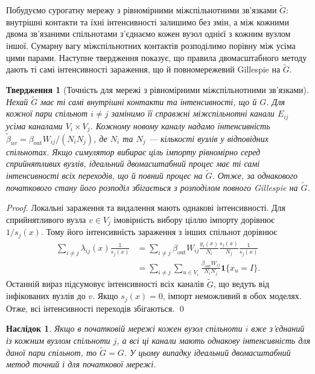 \documentclass[a4paper,fleqn]{cas-sc}
\newtheorem{proposition}{Твердження}
\newtheorem{corollary}{Наслідок}
\newcommand{\ind}{\mathbf{1}}
\begin{document}
Побудуємо сурогатну мережу з рівномірними міжспільнотними зв’язками $\tilde G$: внутрішні контакти та їхні інтенсивності залишимо без змін, а між кожними двома зв’язаними спільнотами з’єднаємо кожен вузол однієї з кожним вузлом іншої. Сумарну вагу міжспільнотних контактів розподілимо порівну між усіма цими парами. Наступне твердження показує, що правила двомасштабного методу дають ті самі інтенсивності зараження, що й повномережевий Gillespie на $\tilde G$.

\begin{proposition}[Точність для мережі з рівномірними міжспільнотними зв’язками]
\label{prop:surrogate}
Нехай $\tilde G$ має ті самі внутрішні контакти та інтенсивності, що й $G$. Для кожної пари спільнот $i\neq j$ замінимо її справжні міжспільнотні канали $E_{ij}$ усіма каналами $V_i\times V_j$. Кожному новому каналу надамо інтенсивність $\tilde\beta_{uv}=\beta_{\mathrm{out}}W_{ij}/(N_iN_j)$, де $N_i$ та $N_j$ --- кількості вузлів у відповідних спільнотах. Якщо симулятор вибирає ціль імпорту рівномірно серед сприйнятливих вузлів, ідеальний двомасштабний процес має ті самі інтенсивності всіх переходів, що й повний процес на $\tilde G$. Отже, за однакового початкового стану його розподіл збігається з розподілом повного Gillespie на $\tilde G$.
\end{proposition}

\begin{proof}
Локальні зараження та видалення мають однакові інтенсивності. Для сприйнятливого вузла $v\in V_j$ імовірність вибору ціллю імпорту дорівнює $1/s_j(x)$. Тому його інтенсивність зараження з інших спільнот дорівнює
\[
\begin{aligned}
\sum_{i\neq j}\lambda_{ij}(x)\frac{1}{s_j(x)}
&=\sum_{i\neq j}\beta_{\mathrm{out}}W_{ij}\frac{y_i(x)}{N_i}\frac{s_j(x)}{N_j}\frac{1}{s_j(x)}\\
&=\sum_{i\neq j}\sum_{u\in V_i}\frac{\beta_{\mathrm{out}}W_{ij}}{N_iN_j}\ind\{x_u=I\}.
\end{aligned}
\]
Останній вираз підсумовує інтенсивності всіх каналів $\tilde G$, що ведуть від інфікованих вузлів до $v$. Якщо $s_j(x)=0$, імпорт неможливий в обох моделях. Отже, всі інтенсивності переходів збігаються. \qed
\end{proof}

\begin{corollary}
\label{cor:exact}
Якщо в початковій мережі кожен вузол спільноти $i$ вже з'єднаний із кожним вузлом спільноти $j$, а всі ці канали мають однакову інтенсивність для даної пари спільнот, то $\tilde G=G$. У цьому випадку ідеальний двомасштабний метод точний і для початкової мережі.
\end{corollary}
\end{document}
